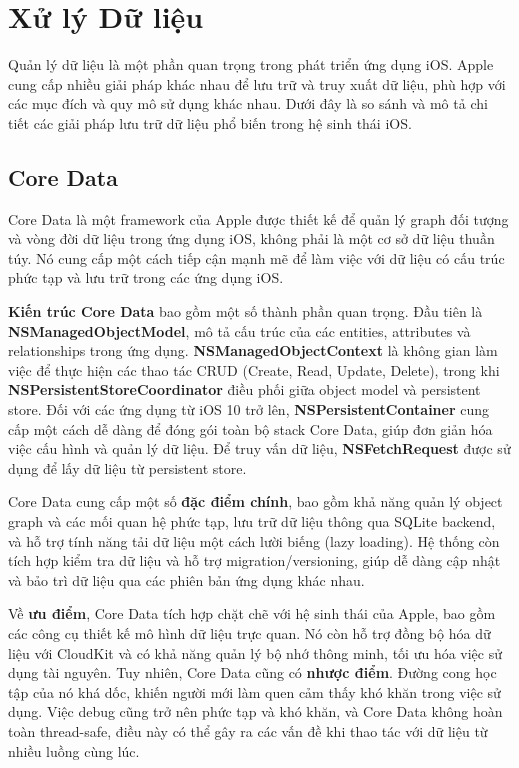 \section{Xử lý Dữ liệu}

Quản lý dữ liệu là một phần quan trọng trong phát triển ứng dụng iOS. Apple cung cấp nhiều giải pháp khác nhau để lưu trữ và truy xuất dữ liệu, phù hợp với các mục đích và quy mô sử dụng khác nhau. Dưới đây là so sánh và mô tả chi tiết các giải pháp lưu trữ dữ liệu phổ biến trong hệ sinh thái iOS.


\subsection{Core Data}
Core Data là một framework của Apple được thiết kế để quản lý graph đối tượng và vòng đời dữ liệu trong ứng dụng iOS, không phải là một cơ sở dữ liệu thuần túy. Nó cung cấp một cách tiếp cận mạnh mẽ để làm việc với dữ liệu có cấu trúc phức tạp và lưu trữ trong các ứng dụng iOS.

\textbf{Kiến trúc Core Data} bao gồm một số thành phần quan trọng. Đầu tiên là \textbf{NSManagedObjectModel}, mô tả cấu trúc của các entities, attributes và relationships trong ứng dụng. \textbf{NSManagedObjectContext} là không gian làm việc để thực hiện các thao tác CRUD (Create, Read, Update, Delete), trong khi \textbf{NSPersistentStoreCoordinator} điều phối giữa object model và persistent store. Đối với các ứng dụng từ iOS 10 trở lên, \textbf{NSPersistentContainer} cung cấp một cách dễ dàng để đóng gói toàn bộ stack Core Data, giúp đơn giản hóa việc cấu hình và quản lý dữ liệu. Để truy vấn dữ liệu, \textbf{NSFetchRequest} được sử dụng để lấy dữ liệu từ persistent store.

Core Data cung cấp một số \textbf{đặc điểm chính}, bao gồm khả năng quản lý object graph và các mối quan hệ phức tạp, lưu trữ dữ liệu thông qua SQLite backend, và hỗ trợ tính năng tải dữ liệu một cách lười biếng (lazy loading). Hệ thống còn tích hợp kiểm tra dữ liệu và hỗ trợ migration/versioning, giúp dễ dàng cập nhật và bảo trì dữ liệu qua các phiên bản ứng dụng khác nhau.

Về \textbf{ưu điểm}, Core Data tích hợp chặt chẽ với hệ sinh thái của Apple, bao gồm các công cụ thiết kế mô hình dữ liệu trực quan. Nó còn hỗ trợ đồng bộ hóa dữ liệu với CloudKit và có khả năng quản lý bộ nhớ thông minh, tối ưu hóa việc sử dụng tài nguyên.
Tuy nhiên, Core Data cũng có \textbf{nhược điểm}. Đường cong học tập của nó khá dốc, khiến người mới làm quen cảm thấy khó khăn trong việc sử dụng. Việc debug cũng trở nên phức tạp và khó khăn, và Core Data không hoàn toàn thread-safe, điều này có thể gây ra các vấn đề khi thao tác với dữ liệu từ nhiều luồng cùng lúc.

